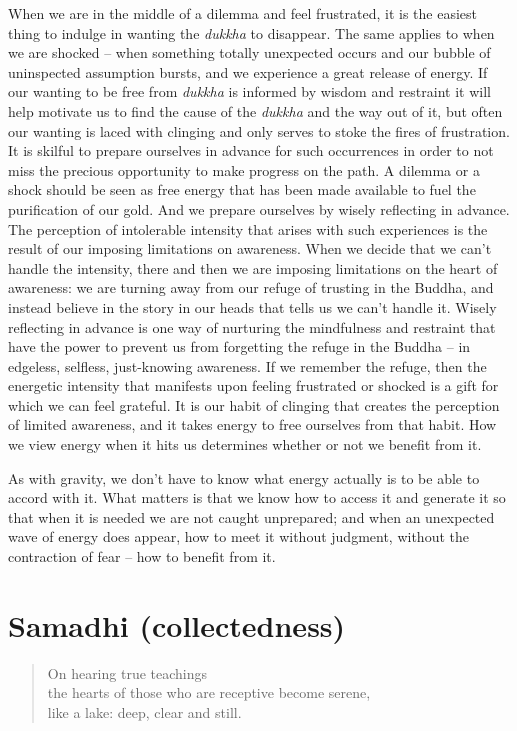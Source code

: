 When we are in the middle of a dilemma and feel frustrated, it is the
easiest thing to indulge in wanting the \emph{dukkha} to disappear. The same
applies to when we are shocked -- when something totally unexpected
occurs and our bubble of uninspected assumption bursts, and we
experience a great release of energy. If our wanting to be free from
\emph{dukkha} is informed by wisdom and restraint it will help motivate us to
find the cause of the \emph{dukkha} and the way out of it, but often our
wanting is laced with clinging and only serves to stoke the fires of
frustration. It is skilful to prepare ourselves in advance for such
occurrences in order to not miss the precious opportunity to make
progress on the path. A dilemma or a shock should be seen as free energy
that has been made available to fuel the purification of our gold. And
we prepare ourselves by wisely reflecting in advance. The perception of
intolerable intensity that arises with such experiences is the result of
our imposing limitations on awareness. When we decide that we can't
handle the intensity, there and then we are imposing limitations on the
heart of awareness: we are turning away from our refuge of trusting in
the Buddha, and instead believe in the story in our heads that tells us
we can't handle it. Wisely reflecting in advance is one way of nurturing
the mindfulness and restraint that have the power to prevent us from
forgetting the refuge in the Buddha -- in edgeless, selfless,
just-knowing awareness. If we remember the refuge, then the energetic
intensity that manifests upon feeling frustrated or shocked is a gift
for which we can feel grateful. It is our habit of clinging that creates
the perception of limited awareness, and it takes energy to free
ourselves from that habit. How we view energy when it hits us determines
whether or not we benefit from it.

As with gravity, we don't have to know what energy actually is to be
able to accord with it. What matters is that we know how to access it
and generate it so that when it is needed we are not caught unprepared;
and when an unexpected wave of energy does appear, how to meet it
without judgment, without the contraction of fear -- how to benefit from
it.

\clearpage
\section{Samadhi (collectedness)}

\begin{quote}
  On hearing true teachings\\
  the hearts of those who are receptive become serene,\\
  like a lake: deep, clear and still.
  
\end{quote}

